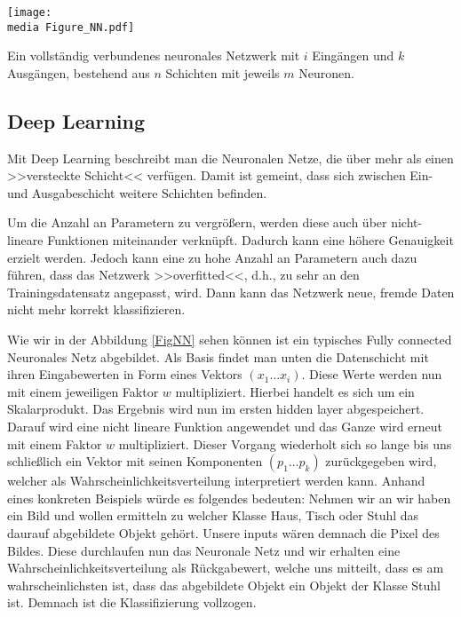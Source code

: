 \begin{dsafigure}
	\begin{center}
		\texttt{[image: \\media Figure\_NN.pdf]}
		\caption{Ein vollständig verbundenes neuronales Netzwerk mit $i$ Eingängen und $k$ Ausgängen, bestehend aus $n$ Schichten mit jeweils $m$ \glqq Neuronen\grqq .}

		\label{FigNN}
	\end{center}
\end{dsafigure}

\subsection{Deep Learning}

Mit Deep Learning beschreibt man die Neuronalen Netze, die über mehr als einen >>versteckte Schicht<< verfügen. Damit ist gemeint, dass sich zwischen Ein- und Ausgabeschicht weitere Schichten befinden. 

Um die Anzahl an Parametern zu vergrößern, werden diese auch über nicht-lineare Funktionen miteinander verknüpft. Dadurch kann eine höhere Genauigkeit erzielt werden. Jedoch kann eine zu hohe Anzahl an Parametern auch dazu führen, dass das Netzwerk >>overfitted<<, d.h., zu sehr an den Trainingsdatensatz angepasst, wird. Dann kann das Netzwerk neue, fremde Daten nicht mehr korrekt klassifizieren. 

Wie wir in der Abbildung \ref{FigNN} sehen können ist ein typisches Fully connected Neuronales Netz abgebildet. Als Basis findet man unten die Datenschicht mit ihren Eingabewerten in Form eines Vektors $(x_1 \dots x_i)$. Diese Werte werden nun mit einem jeweiligen Faktor $w$ multipliziert. Hierbei handelt es sich um ein Skalarprodukt. Das Ergebnis wird nun im ersten hidden layer abgespeichert. Darauf wird eine nicht lineare Funktion angewendet und das Ganze wird erneut mit einem Faktor $w$ multipliziert. Dieser Vorgang wiederholt sich so lange bis uns schließlich ein Vektor mit seinen Komponenten $(p_1 \dots p_k)$ zurückgegeben wird, welcher als Wahrscheinlichkeitsverteilung interpretiert werden kann. Anhand eines konkreten Beispiels würde es folgendes bedeuten:
Nehmen wir an wir haben ein Bild und wollen ermitteln zu welcher Klasse Haus, Tisch oder Stuhl das daurauf abgebildete Objekt gehört. Unsere inputs wären demnach die Pixel des Bildes. Diese durchlaufen nun das Neuronale Netz und wir erhalten eine Wahrscheinlichkeitsverteilung als Rückgabewert, welche uns mitteilt, dass es am wahrscheinlichsten ist, dass das abgebildete Objekt ein Objekt der Klasse Stuhl ist. Demnach ist die Klassifizierung vollzogen.

